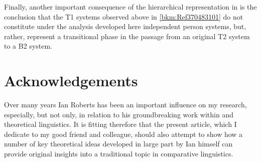 \documentclass[output=paper]{langsci/langscibook}
\begin{document}
Finally, another important consequence of the hierarchical
representation in
 is the conclusion that the T1 systems observed above in
\cref{bkm:Ref370483101} do not constitute under the analysis developed here
independent person systems, but, rather, represent a transitional phase in the
passage from an original T2 system to a B2 system.

\printchapterglossary{}

\section*{Acknowledgements}

Over many years Ian Roberts has been an important influence on my research,
especially, but not only, in relation to his groundbreaking work within 
and theoretical linguistics.  It is fitting therefore that the present article,
which I dedicate to my good friend and colleague, should also attempt to show
how a number of key theoretical ideas developed in large part by Ian himself
can provide original insights into a traditional topic in comparative 
linguistics.

{\sloppy
\printbibliography[heading=subbibliography,notkeyword=this]
}
\end{document}
